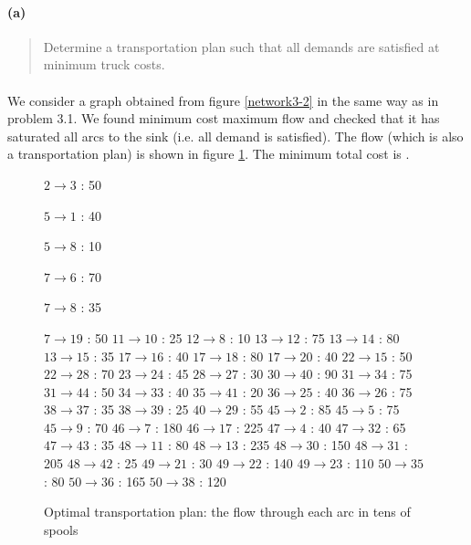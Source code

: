 \paragraph{(a)}
\begin{quote}
Determine a transportation plan such that all demands are satisfied at minimum truck costs.
\end{quote}

\paragraph{}
We consider a graph obtained from figure \ref{network3-2} in the same way as in problem 3.1. We found minimum cost maximum flow and checked that it has saturated all arcs to the sink (i.e. all demand is satisfied). The flow (which is also a transportation plan) is shown in figure \ref{flow3-2a}. The minimum total cost is .

\begin{figure}[H]
\centering
\begin{multicols}{5}
$ 2 \rightarrow 3 $ : 50

$ 5 \rightarrow 1 $ : 40

$ 5 \rightarrow 8 $ : 10

$ 7 \rightarrow 6 $ : 70

$ 7 \rightarrow 8 $ : 35

$ 7 \rightarrow 19 $ : 50
$ 11 \rightarrow 10 $ : 25
$ 12 \rightarrow 8 $ : 10
$ 13 \rightarrow 12 $ : 75
$ 13 \rightarrow 14 $ : 80
$ 13 \rightarrow 15 $ : 35
$ 17 \rightarrow 16 $ : 40
$ 17 \rightarrow 18 $ : 80
$ 17 \rightarrow 20 $ : 40
$ 22 \rightarrow 15 $ : 50
$ 22 \rightarrow 28 $ : 70
$ 23 \rightarrow 24 $ : 45
$ 28 \rightarrow 27 $ : 30
$ 30 \rightarrow 40 $ : 90
$ 31 \rightarrow 34 $ : 75
$ 31 \rightarrow 44 $ : 50
$ 34 \rightarrow 33 $ : 40
$ 35 \rightarrow 41 $ : 20
$ 36 \rightarrow 25 $ : 40
$ 36 \rightarrow 26 $ : 75
$ 38 \rightarrow 37 $ : 35
$ 38 \rightarrow 39 $ : 25
$ 40 \rightarrow 29 $ : 55
$ 45 \rightarrow 2 $ : 85
$ 45 \rightarrow 5 $ : 75
$ 45 \rightarrow 9 $ : 70
$ 46 \rightarrow 7 $ : 180
$ 46 \rightarrow 17 $ : 225
$ 47 \rightarrow 4 $ : 40
$ 47 \rightarrow 32 $ : 65
$ 47 \rightarrow 43 $ : 35
$ 48 \rightarrow 11 $ : 80
$ 48 \rightarrow 13 $ : 235
$ 48 \rightarrow 30 $ : 150
$ 48 \rightarrow 31 $ : 205
$ 48 \rightarrow 42 $ : 25
$ 49 \rightarrow 21 $ : 30
$ 49 \rightarrow 22 $ : 140
$ 49 \rightarrow 23 $ : 110
$ 50 \rightarrow 35 $ : 80
$ 50 \rightarrow 36 $ : 165
$ 50 \rightarrow 38 $ : 120
\end{multicols}
\caption{Optimal transportation plan: the flow through each arc in tens of spools}
\label{flow3-2a}
\end{figure}

